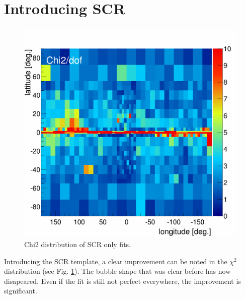 \section{Introducing SCR}

\begin{figure}[h]
  	\centering
	\includegraphics[width=.9\linewidth]{pic/results/SCRonly_Chi2Distribution.png}
  	\caption{Chi2 distribution of SCR only fits.}
  	\label{fig:SCRonly_fit}
\end{figure}

Introducing the SCR template, a clear improvement can be noted in the $\chi^2$ distribution (see Fig. \ref{fig:SCRonly_fit}). The bubble shape that was clear before has now disapeared. Even if the fit is still not perfect everywhere, the improvement is significant.

